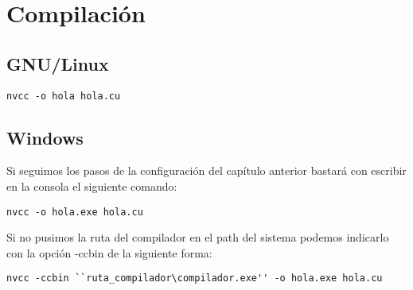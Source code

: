 \section{Compilación}
\subsection{GNU/Linux}
\begin{lstlisting}[style=consola]
nvcc -o hola hola.cu
\end{lstlisting}
\subsection{Windows}
Si seguimos los pasos de la configuración del capítulo anterior bastará con escribir en la consola el siguiente comando:
\begin{lstlisting}[style=consola]
nvcc -o hola.exe hola.cu
\end{lstlisting}

Si no pusimos la ruta del compilador en el path del sistema podemos indicarlo con la opción -ccbin de la siguiente forma:
\begin{lstlisting}[style=consola]
nvcc -ccbin ``ruta_compilador\compilador.exe'' -o hola.exe hola.cu
\end{lstlisting}
